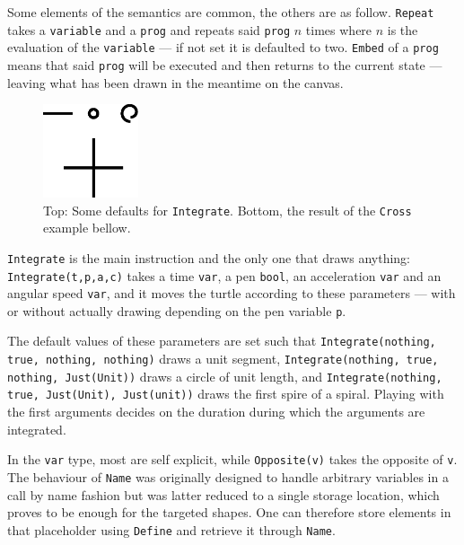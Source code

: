 \documentclass{article}
\begin{document}
Some elements of the semantics are common, the others are as follow.
\texttt{Repeat} takes a \texttt{variable} and a \texttt{prog} and repeats
said \texttt{prog} $n$ times where $n$ is the evaluation of the
\texttt{variable} --- if not set it is defaulted to two. \texttt{Embed} of a
\texttt{prog} means that said \texttt{prog} will be executed and then returns to
the current state --- leaving what has been drawn in the meantime on the canvas.

\begin{figure}
  \begin{center}
    \includegraphics[width = 0.25\textwidth]{figures/DSLGeom.eps}
  \end{center}\label{dslgeom}\caption{Top: Some defaults for \texttt{Integrate}.
  Bottom, the result of the \texttt{Cross} example bellow.}
\end{figure}

\texttt{Integrate} is the main instruction and the only one that draws anything:
\texttt{Integrate(t,p,a,c)} takes a time \texttt{var}, a pen \texttt{bool}, an
acceleration \texttt{var} and an angular speed \texttt{var}, and it moves the
turtle according to these parameters --- with or without actually drawing
depending on the pen variable \texttt{p}.

The default values of these parameters are set such that \texttt{Integrate(nothing,
true, nothing, nothing)} draws a unit segment, \texttt{Integrate(nothing, true,
nothing, Just(Unit))} draws a circle of unit length, and
\texttt{Integrate(nothing, true, Just(Unit), Just(unit))} draws the first spire
of a spiral. Playing with the first arguments decides on the duration during
which the arguments are integrated.

In the \texttt{var} type, most are self explicit, while \texttt{Opposite(v)}
takes the opposite of \texttt{v}. The behaviour of \texttt{Name} was originally
designed to handle arbitrary variables in a call by name fashion but was latter
reduced to a single storage location, which proves to be enough for the
targeted shapes. One can therefore store elements in that placeholder using
\texttt{Define} and retrieve it through \texttt{Name}.
\end{document}
